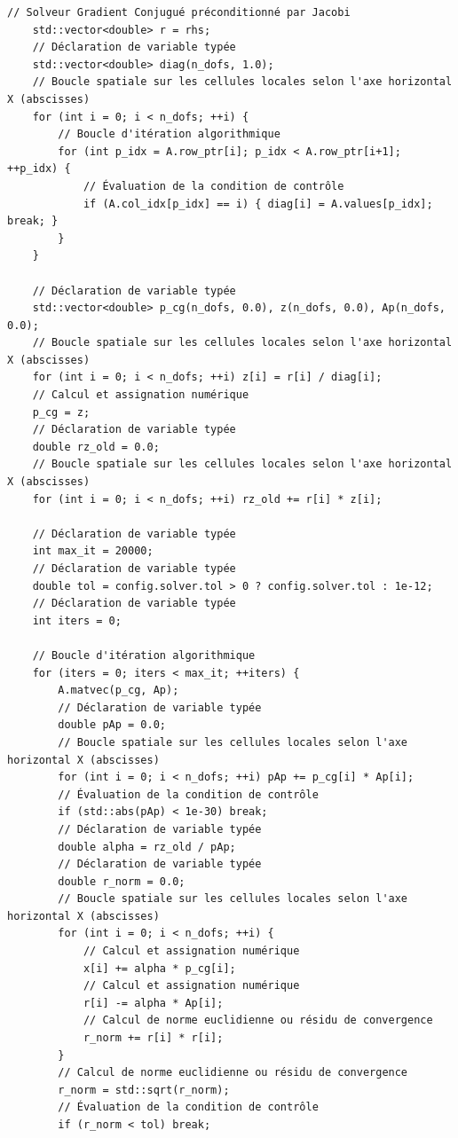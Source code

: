 \documentclass[10pt,a4paper,oneside]{book}
\begin{document}
\begin{lstlisting}[language={[11]C++}]
    // Solveur Gradient Conjugué préconditionné par Jacobi
    std::vector<double> r = rhs;
    // Déclaration de variable typée
    std::vector<double> diag(n_dofs, 1.0);
    // Boucle spatiale sur les cellules locales selon l'axe horizontal X (abscisses)
    for (int i = 0; i < n_dofs; ++i) {
        // Boucle d'itération algorithmique
        for (int p_idx = A.row_ptr[i]; p_idx < A.row_ptr[i+1]; ++p_idx) {
            // Évaluation de la condition de contrôle
            if (A.col_idx[p_idx] == i) { diag[i] = A.values[p_idx]; break; }
        }
    }

    // Déclaration de variable typée
    std::vector<double> p_cg(n_dofs, 0.0), z(n_dofs, 0.0), Ap(n_dofs, 0.0);
    // Boucle spatiale sur les cellules locales selon l'axe horizontal X (abscisses)
    for (int i = 0; i < n_dofs; ++i) z[i] = r[i] / diag[i];
    // Calcul et assignation numérique
    p_cg = z;
    // Déclaration de variable typée
    double rz_old = 0.0;
    // Boucle spatiale sur les cellules locales selon l'axe horizontal X (abscisses)
    for (int i = 0; i < n_dofs; ++i) rz_old += r[i] * z[i];

    // Déclaration de variable typée
    int max_it = 20000;
    // Déclaration de variable typée
    double tol = config.solver.tol > 0 ? config.solver.tol : 1e-12;
    // Déclaration de variable typée
    int iters = 0;

    // Boucle d'itération algorithmique
    for (iters = 0; iters < max_it; ++iters) {
        A.matvec(p_cg, Ap);
        // Déclaration de variable typée
        double pAp = 0.0;
        // Boucle spatiale sur les cellules locales selon l'axe horizontal X (abscisses)
        for (int i = 0; i < n_dofs; ++i) pAp += p_cg[i] * Ap[i];
        // Évaluation de la condition de contrôle
        if (std::abs(pAp) < 1e-30) break;
        // Déclaration de variable typée
        double alpha = rz_old / pAp;
        // Déclaration de variable typée
        double r_norm = 0.0;
        // Boucle spatiale sur les cellules locales selon l'axe horizontal X (abscisses)
        for (int i = 0; i < n_dofs; ++i) {
            // Calcul et assignation numérique
            x[i] += alpha * p_cg[i];
            // Calcul et assignation numérique
            r[i] -= alpha * Ap[i];
            // Calcul de norme euclidienne ou résidu de convergence
            r_norm += r[i] * r[i];
        }
        // Calcul de norme euclidienne ou résidu de convergence
        r_norm = std::sqrt(r_norm);
        // Évaluation de la condition de contrôle
        if (r_norm < tol) break;


\end{lstlisting}
\end{document}
